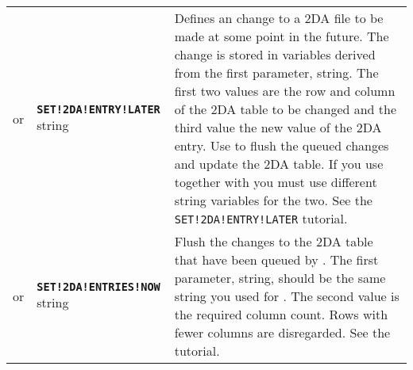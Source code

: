 \documentclass{article}
\def\ttref#1{\ahrefloc{#1}{\tt #1}}
\def\DEFINE#1{{\tt \bf #1}\label{#1}\index{#1}}
\def\DEFSYN#1{{\tt \bf #1}\index{#1}}
\def\t#1{{\tt #1}}
\begin{document}
\begin{tabular}{cp{10in}|p{10in}}
  or & \DEFINE{SET!2DA!ENTRY!LATER} string \ttref{value} \ttref{value}
  \ttref{value} &

  Defines an change to a 2DA file to be made at some point in the
  future. The change is stored in variables derived from the
  first parameter, string. The first two values are the row and column
  of the 2DA table to be changed and the third value the new value of
  the 2DA entry. Use \ttref{SET!2DA!ENTRIES!NOW} to flush the queued
  changes and update the 2DA table. If you use
  \ttref{SET!2DA!ENTRY!LATER} together with
  \ttref{READ!2DA!ENTRY!FORMER} you must use different string
  variables for the two. See the \t{SET!2DA!ENTRY!LATER} tutorial. \\

  or & \DEFSYN{SET!2DA!ENTRIES!NOW} string \ttref{value} &

  Flush the changes to the 2DA table that have been queued by
  \ttref{SET!2DA!ENTRY!LATER}. The first parameter, string, should be
  the same string you used for \ttref{SET!2DA!ENTRY!LATER}. The second
  value is the required column count. Rows with fewer columns are
  disregarded. See the \ttref{SET!2DA!ENTRIES!NOW} tutorial. \\


\end{tabular}
\end{document}
